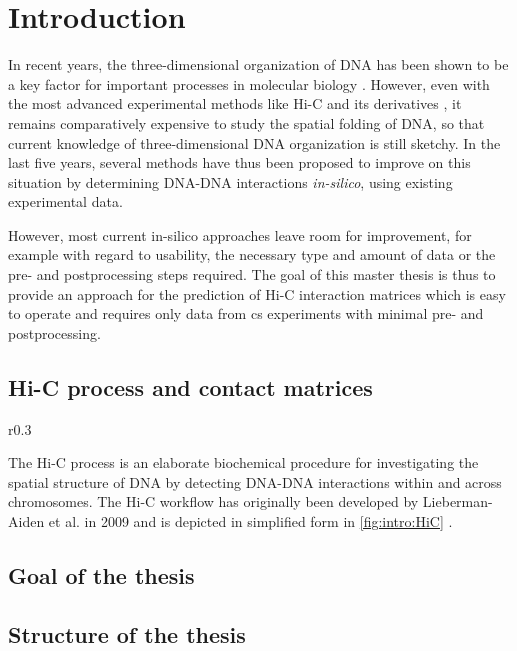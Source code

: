 \section{Introduction}
In recent years, the three-dimensional organization of DNA has been shown to 
be a key factor for important processes in molecular biology \cite{Chathoth2019,Zhang2019b}.
However, even with the most advanced experimental methods like Hi-C and its derivatives \cite{LiebermanAiden2009, Rao2014, Belaghzal2017}, 
it remains comparatively expensive to study the spatial folding of DNA,
so that current knowledge of three-dimensional DNA organization is still sketchy.
In the last five years, several methods have thus been proposed to improve on this situation
by determining DNA-DNA interactions \emph{in-silico}, using existing experimental data.

However, most current in-silico approaches leave room for improvement, for example with regard to usability, the necessary type and amount of data or the pre- and postprocessing steps required.
The goal of this master thesis is thus to provide an approach for the prediction of Hi-C interaction matrices which is easy to operate and requires only data from \acrshort{cs}
experiments with minimal pre- and postprocessing.

\subsection{Hi-C process and contact matrices} \label{sec:intro:hic}
\begin{wrapfigure}[36]{r}{0.3\textwidth}
 \caption{Hi-C lab process}
 \label{fig:intro:HiC}
\end{wrapfigure}
The Hi-C process is an elaborate biochemical procedure for investigating the 
spatial structure of DNA by detecting DNA-DNA interactions within and 
across chromosomes.
The Hi-C workflow has originally been developed by Lieberman-Aiden et al. in 2009  \cite{LiebermanAiden2009}
and is depicted in simplified form in \cref{fig:intro:HiC} \cite{Krauth2020}.

\subsection{Goal of the thesis}
\subsection{Structure of the thesis}
